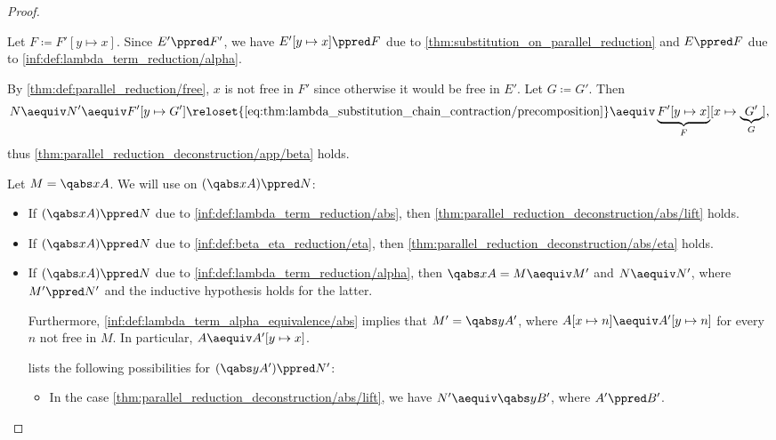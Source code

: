 \begin{proof}
\begin{itemize}
\begin{itemize}
\begin{itemize}
        Let \( F \coloneqq F'[y \mapsto x] \). Since \( E' \ppred F' \), we have \( E'[y \mapsto x] \ppred F \) due to \cref{thm:substitution_on_parallel_reduction} and \( E \ppred F \) due to \ref{inf:def:lambda_term_reduction/alpha}.

        By \cref{thm:def:parallel_reduction/free}, \( x \) is not free in \( F' \) since otherwise it would be free in \( E' \). Let \( G \coloneqq G' \). Then
        \begin{equation*}
          N
          \aequiv
          N'
          \aequiv
          F'[y \mapsto G']
          \reloset {\eqref{eq:thm:lambda_substitution_chain_contraction/precomposition}} \aequiv
          \underbrace{F'[y \mapsto x]}_F [x \mapsto \underbrace{G'}_G],
        \end{equation*}
        thus \ref{thm:parallel_reduction_deconstruction/app/beta} holds.
      \end{itemize}
    \end{itemize}
  \end{itemize}

   Let \( M = \qabs x A \). We will use  on \( (\qabs x A) \ppred N \):
  \begin{itemize}
    \item If \( (\qabs x A) \ppred N \) due to \ref{inf:def:lambda_term_reduction/abs}, then \ref{thm:parallel_reduction_deconstruction/abs/lift} holds.

    \item If \( (\qabs x A) \ppred N \) due to \ref{inf:def:beta_eta_reduction/eta}, then \ref{thm:parallel_reduction_deconstruction/abs/eta} holds.

    \item If \( (\qabs x A) \ppred N \) due to \ref{inf:def:lambda_term_reduction/alpha}, then \( \qabs x A = M \aequiv M' \) and \( N \aequiv N' \), where \( M' \ppred N' \) and the inductive hypothesis holds for the latter.

    Furthermore, \ref{inf:def:lambda_term_alpha_equivalence/abs} implies that \( M' = \qabs y A' \), where \( A[x \mapsto n] \aequiv A'[y \mapsto n] \) for every \( n \) not free in \( M \). In particular, \( A \aequiv A'[y \mapsto x] \).

     lists the following possibilities for \( (\qabs y A') \ppred N' \):
    \begin{itemize}
      \item In the case \ref{thm:parallel_reduction_deconstruction/abs/lift}, we have \( N' \aequiv \qabs y B' \), where \( A' \ppred B' \).


\end{itemize}
\end{itemize}
\end{proof}
